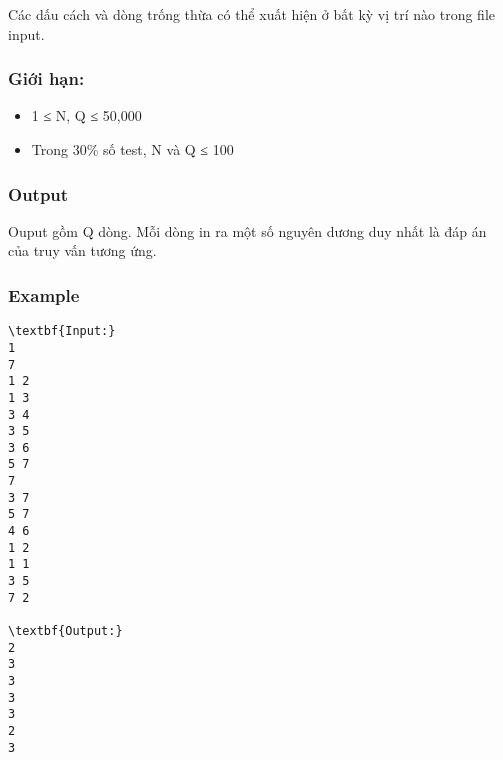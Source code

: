    Các dấu cách và dòng trống thừa có thể xuất hiện ở bất kỳ vị trí nào trong file input.  

\subsubsection{   Giới hạn:  }
\begin{itemize}
	\item     1 ≤ N, Q ≤ 50,000   
	\item     Trong 30\% số test, N và Q ≤ 100   
\end{itemize}

\subsubsection{   Output  }

   Ouput gồm Q dòng. Mỗi dòng in ra một số nguyên dương duy nhất là đáp án của truy vấn tương ứng.  

\subsubsection{   Example  }
\begin{verbatim}
\textbf{Input:}
1
7
1 2
1 3
3 4
3 5
3 6
5 7
7
3 7
5 7
4 6
1 2
1 1
3 5
7 2

\textbf{Output:}
2
3
3
3
3
2
3
\end{verbatim}